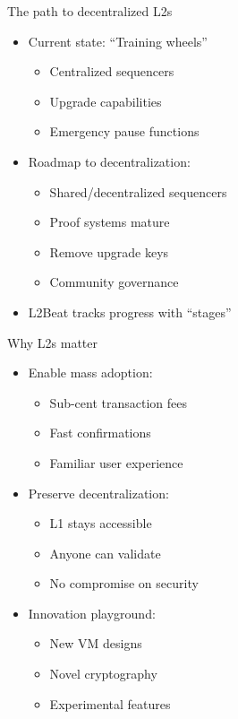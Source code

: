 \documentclass[aspectratio=169, lualatex, handout]{beamer}
\begin{document}
\begin{frame}{The path to decentralized L2s}
	\begin{itemize}
		\item Current state: ``Training wheels''
		      \begin{itemize}
			      \item Centralized sequencers
			      \item Upgrade capabilities
			      \item Emergency pause functions
		      \end{itemize}
		\item Roadmap to decentralization:
		      \begin{itemize}
			      \item Shared/decentralized sequencers
			      \item Proof systems mature
			      \item Remove upgrade keys
			      \item Community governance
		      \end{itemize}
		\item L2Beat tracks progress with ``stages''
	\end{itemize}
\end{frame}

\begin{frame}{Why L2s matter}
	\begin{itemize}
		\item Enable mass adoption:
		      \begin{itemize}
			      \item Sub-cent transaction fees
			      \item Fast confirmations
			      \item Familiar user experience
		      \end{itemize}
		\item Preserve decentralization:
		      \begin{itemize}
			      \item L1 stays accessible
			      \item Anyone can validate
			      \item No compromise on security
		      \end{itemize}
		\item Innovation playground:
		      \begin{itemize}
			      \item New VM designs
			      \item Novel cryptography
			      \item Experimental features
		      \end{itemize}
	\end{itemize}
\end{frame}

\begin{frame}[plain]
	\titlepage
\end{frame}
\end{document}
